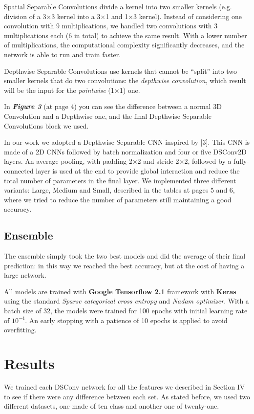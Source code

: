 \documentclass[conference]{IEEEtran}
\begin{document}
Spatial Separable Convolutions divide a kernel into two smaller kernels (e.g. division of a 3$\times$3 kernel into a 3$\times$1 and 1$\times$3 kernel). Instead of considering one convolution with 9 multiplications, we handled two convolutions with 3 multiplications each (6 in total) to achieve the same result. With a lower number of multiplications, the computational complexity significantly decreases, and the network is able to run and train faster.

Depthwise Separable Convolutions use kernels that cannot be “split” into two smaller kernels that do two convolutions: the \textit{depthwise convolution}, which result will be the input for the \textit{pointwise} (1$\times$1) one.

In \textbf{\textit{Figure 3}} (at page 4) you can see the difference between a normal 3D Convolution and a Depthwise one, and the final Depthwise Separable Convolutions block we used. 

In our work we adopted a Depthwise Separable CNN inspired by [3]. This CNN is made of a 2D CNNs followed by batch normalization and four or five DSConv2D layers. An average pooling, with padding 2$\times$2 and stride 2$\times$2, followed by a fully-connected layer is used at the end to provide global interaction and reduce the total number of parameters in the final layer.
We implemented three different variants: Large, Medium and Small, described in the tables at pages 5 and 6, where we tried to reduce the number of parameters still maintaining a good accuracy.

\subsection{Ensemble}
The ensemble simply took the two best models and did the average of their final prediction: in this way we reached the best accuracy, but at the cost of having a large network.

All models are trained with \textbf{Google Tensorflow 2.1} framework with \textbf{Keras} using the standard \textit{Sparse categorical cross entropy} and \textit{Nadam optimizer}. With a batch size of 32, the models were trained for 100 epochs with initial learning rate of $10^{-4}$. An early stopping with a patience of 10 epochs is applied to avoid overfitting.

\section{Results}
We trained each DSConv network for all the features we described in Section IV to see if there were any difference between each set. As stated before, we used two different datasets, one made of ten class and another one of twenty-one.
\end{document}
